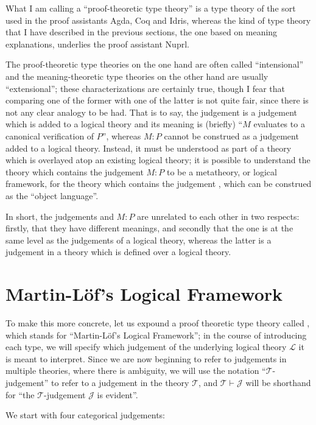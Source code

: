 \documentclass[main.tex]{subfiles}
\begin{document}
What I am calling a ``proof-theoretic type theory'' is a type theory of the
sort used in the proof assistants Agda, Coq and Idris, whereas the kind of
type theory that I have described in the previous sections, the one based on
meaning explanations, underlies the proof assistant Nuprl.

The proof-theoretic type theories on the one hand are often called
``intensional'' and the meaning-theoretic type theories on the other hand are
usually ``extensional''; these characterizations are certainly true, though I
fear that comparing one of the former with one of the latter is not quite fair,
since there is not any clear analogy to be had. That is to say, the judgement
 is a judgement which is added to a logical theory and its meaning is
(briefly) ``$M$ evaluates to a canonical verification of $P$'', whereas $M:P$ cannot
be construed as a judgement added to a logical theory. Instead, it must be
understood as part of a theory which is overlayed atop an existing logical
theory; it is possible to understand the theory which contains the judgement
$M:P$ to be a metatheory, or logical framework, for the theory which contains
the judgement , which can be construed as the ``object language''.

In short, the judgements  and $M:P$ are unrelated to each other in
two respects: firstly, that they have different meanings, and secondly that the
one is at the same level as the judgements of a logical theory, whereas the
latter is a judgement in a theory which is defined over a logical theory.

\section{Martin-L\"of's Logical Framework}

To make this more concrete, let us expound a proof theoretic type theory called
\MLLF, which stands for ``Martin-L\"of's Logical Framework''; in the course of
introducing each type, we will specify which judgement of the underlying
logical theory $\mathcal{L}$ it is meant to interpret. Since we are now
beginning to refer to judgements in multiple theories, where there is
ambiguity, we will use the notation ``$\mathcal{T}$-judgement'' to refer to a
judgement in the theory $\mathcal{T}$, and $\mathcal{T}\vdash\mathcal{J}$ will
be shorthand for ``the $\mathcal{T}$-judgement $\mathcal{J}$ is evident''.

We start with four categorical judgements:\\
\end{document}
